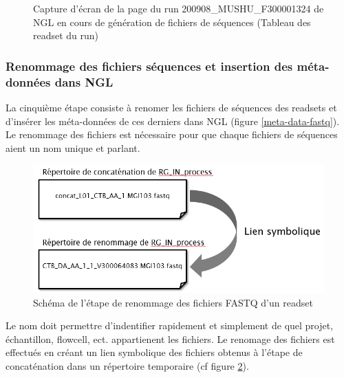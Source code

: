 \begin{figure}[H]
    \centering
    \caption{\footnotesize{Capture d'écran de la page du run 200908\_MUSHU\_F300001324 de NGL en cours de génération de fichiers de séquences (Tableau des readset du run)}}
    \label{NGL-screenshot_tab-run-readset}
\end{figure}

\subsubsection*{Renommage des fichiers séquences et insertion des méta-données dans NGL}
La cinquième étape consiste à renomer les fichiers de séquences des readsets et d'insérer les méta-données de ces derniers dans NGL (figure \ref{meta-data-fastq}).
Le renommage des fichiers est nécessaire pour que chaque fichiers de séquences aient un nom unique et \og parlant\fg{}.\\

\begin{minipage}{0.45\textwidth}
    \begin{figure}[H]
        \centering
        \includegraphics[width=1\textwidth]{img/Schema-renomage-fastq.png}
        \caption{\footnotesize{Schéma de l'étape de renommage des fichiers FASTQ d'un readset}}
        \label{schema-rename-fastq}
    \end{figure}
\end{minipage}
\hfill
\begin{minipage}{0.45\textwidth}
    Le nom doit permettre d'indentifier rapidement et simplement de quel projet, échantillon, flowcell, ect.
    appartienent les fichiers.
    Le renomage des fichiers est effectués en créant un lien symbolique des fichiers obtenus à l'étape de \og concaténation\fg{} dans un répertoire temporaire (cf figure \ref{schema-rename-fastq}).
\end{minipage}\\\\

